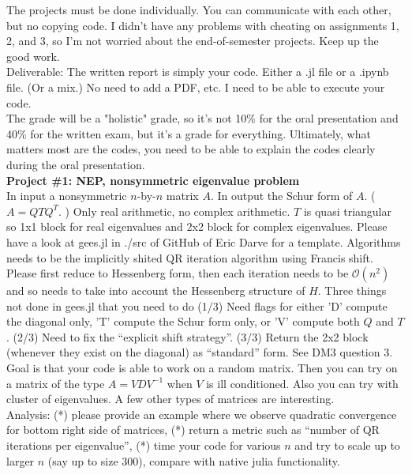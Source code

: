 \documentclass[11pt,letterpaper]{article}
\begin{document}
The projects must be done individually. You can communicate with each other,
but no copying code. I didn't have any problems with cheating on assignments 1,
2, and 3, so I'm not worried about the end-of-semester projects. Keep up the
good work.\\
 
Deliverable: The written report is simply your code. Either a .jl file or a
.ipynb file. (Or a mix.) No need to add a PDF, etc. I need to be able to execute your code. \\

The grade will be a "holistic" grade, so it's not 10\% for the oral
presentation and 40\% for the written exam, but it's a grade for everything.
Ultimately, what matters most are the codes, you need to be able to explain the
codes clearly during the oral presentation.\\

{\Large \bf Project \#1: NEP, nonsymmetric eigenvalue problem}\\

In input a nonsymmetric $n$-by-$n$ matrix $A$. In output the Schur form of $A$.
( $A = Q T Q^T$. ) Only real arithmetic, no complex arithmetic. $T$ is quasi
triangular so 1x1 block for real eigenvalues and 2x2 block for complex
eigenvalues. Please have a look at gees.jl in ./src of GitHub of Eric Darve for
a template. Algorithms needs to be the implicitly shited QR iteration algorithm using
Francis shift. Please first reduce to Hessenberg form, then each iteration
needs to be $\mathcal{O}(n^2)$ and so needs to take into account the Hessenberg structure of $H$.
Three things not done in gees.jl that you need to do (1/3) Need flags for
either 'D' compute the diagonal only, 'T' compute the Schur form only, or 'V'
compute both $Q$ and $T$. (2/3) Need to fix the ``explicit shift strategy''.
(3/3) Return the 2x2 block (whenever they exist on the diagonal) as ``standard''
form. See DM3 question 3.\\

Goal is that your code is able to work on a random matrix. Then you can try on a
matrix of the type $A = VDV^{-1}$ when $V$ is ill conditioned. Also you can try with cluster of
eigenvalues. A few other types of matrices are interesting.\\

Analysis: (*) please provide an example where we observe quadratic convergence for bottom right side of matrices,
(*) return a metric such as ``number of QR iterations per eigenvalue'', (*) time
your code for various $n$ and try to scale up to larger $n$ (say up to size $300$), 
compare with native julia functionality.\\
\end{document}
